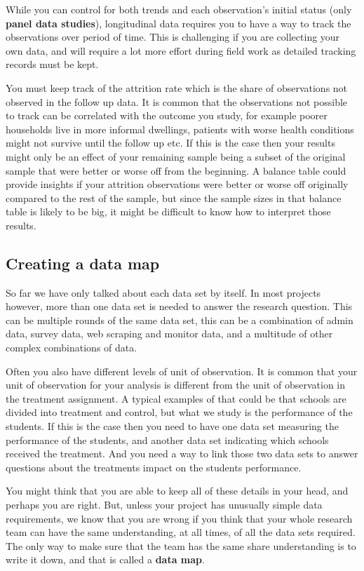 While you can control for both trends 
and each observation's initial status (only \textbf{panel data studies}), 
longitudinal data requires you to have a way to track the observations over period of time.
This is challenging if you are collecting your own data, 
and will require a lot more effort during field work as detailed tracking records must be kept.

You must keep track of the attrition rate which is the share of observations not observed in the follow up data.
It is common that the observations not possible to track can be correlated with the outcome you study,
for example poorer households live in more informal dwellings,
patients with worse health conditions might not survive until the follow up etc. 
If this is the case then your results might only be an effect of your remaining sample
being a subset of the original sample that were better or worse off from the beginning.
A balance table could provide insights if your attrition observations were better or worse off 
originally compared to the rest of the sample, 
but since the sample sizes in that balance table is likely to be big, 
it might be difficult to know how to interpret those results.


\subsection{Creating a data map}

So far we have only talked about each data set by itself. 
In most projects however, more than one data set is needed to answer the research question. 
This can be multiple rounds of the same data set, 
this can be a combination of admin data, survey data, web scraping and monitor data, 
and a multitude of other complex combinations of data. 

Often you also have different levels of unit of observation. 
It is common that your unit of observation for your analysis is different from the unit of observation in the treatment assignment.
A typical examples of that could be that schools are divided into treatment and control, 
but what we study is the performance of the students. 
If this is the case then you need to have one data set measuring the performance of the students, 
and another data set indicating which schools received the treatment. 
And you need a way to link those two data sets to answer questions about the treatments impact on the students performance.

You might think that you are able to keep all of these details in your head, and perhaps you are right. 
But, unless your project has unusually simple data requirements, 
we know that you are wrong if you think that your whole research team can have the same understanding, 
at all times, of all the data sets required.
The only way to make sure that the team has the same share understanding is to write it down, 
and that is called a \textbf{data map}. 

